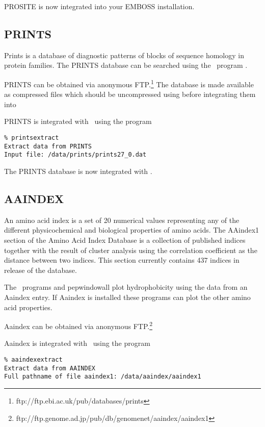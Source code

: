 \documentclass{report}
\begin{document}
PROSITE is now integrated into your EMBOSS installation.

\subsection{PRINTS}

Prints is a database of diagnostic patterns of blocks of sequence
homology in protein families. The PRINTS database can be searched
using the \EMBOSS\ program .

PRINTS can be obtained via anonymous
FTP.\footnote{ftp://ftp.ebi.ac.uk/pub/databases/prints} The database
is made available as compressed files which should be uncompressed
using  before integrating them into \EMBOSS

PRINTS is integrated with \EMBOSS\ using the program 

\begin{verbatim}
% printsextract
Extract data from PRINTS
Input file: /data/prints/prints27_0.dat
\end{verbatim}

The PRINTS database is now integrated with \EMBOSS.

\subsection{AAINDEX}

An amino acid index is a set of 20 numerical values representing any
of the different physicochemical and biological properties of amino
acids.  The AAindex1 section of the Amino Acid Index Database is a
collection of published indices together with the result of cluster
analysis using the correlation coefficient as the distance between two
indices.  This section currently contains 437 indices in release
 of the database.

The \EMBOSS\ programs  and {pepwindowall} plot
hydrophobicity using the data from an Aaindex entry. If Aaindex is
installed these programs can plot the other amino acid properties.

Aaindex can be obtained via anonymous
FTP.\footnote{ftp://ftp.genome.ad.jp/pub/db/genomenet/aaindex/aaindex1}

Aaindex is integrated with \EMBOSS\ using the program 

\begin{verbatim}
% aaindexextract
Extract data from AAINDEX
Full pathname of file aaindex1: /data/aaindex/aaindex1
\end{verbatim}
\end{document}
